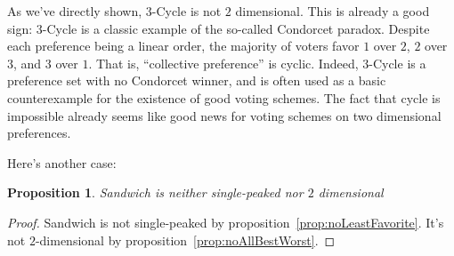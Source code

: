 \documentclass[12pt]{article}
\newtheorem{proposition}[theorem]{Proposition}
\newcommand{\1}[1]{\mathds{1}[{#1}]}
\begin{document}
  As we've directly shown, $3$-{\sc Cycle} is not $2$ dimensional.
  This is already a good sign: $3$-{\sc Cycle} is a classic example of the
  so-called Condorcet paradox. Despite each preference being a linear order,
  the majority of voters favor $1$ over $2$, $2$ over $3$, and $3$ over $1$.
  That is, ``collective preference'' is cyclic.
  Indeed, $3$-{\sc Cycle} is a preference set with no Condorcet winner,
  and is often used as a basic counterexample for the existence of good voting
  schemes. The fact that cycle is impossible already seems like good news for
  voting schemes on two dimensional preferences.

  Here's another case:
  \begin{proposition}
    {\sc Sandwich} is neither single-peaked nor $2$ dimensional
  \end{proposition}
  \begin{proof}
    {\sc Sandwich} is not single-peaked by proposition~\ref{prop:noLeastFavorite}.
    It's not $2$-dimensional by proposition~\ref{prop:noAllBestWorst}.
  \end{proof}
\end{document}
